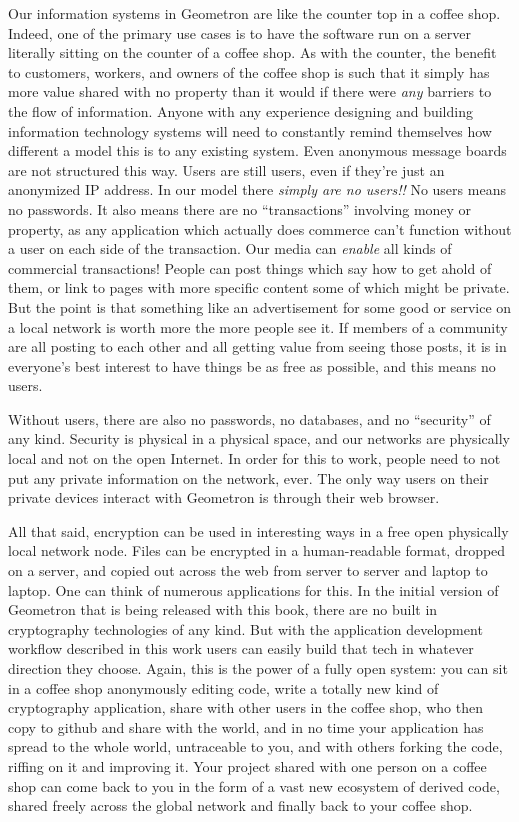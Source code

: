 Our information systems in Geometron are like the counter top in a coffee shop.  Indeed, one of the primary use cases is to have the software run on a server literally sitting on the counter of a coffee shop.  As with the counter, the benefit to customers, workers, and owners of the coffee shop is such that it simply has more value shared with no property than it would if there were \emph{any} barriers to the flow of information.  Anyone with any experience designing and building information technology systems will need to constantly remind themselves how different a model this is to any existing system.  Even anonymous message boards are not structured this way.  Users are still users, even if they're just an anonymized IP address.  In our model there \emph{simply are no users!!}  No users means no passwords. It also means there are no ``transactions'' involving money or property, as any application which actually does commerce can't function without a user on each side of the transaction.  Our media can \emph{enable} all kinds of commercial transactions! People can post things which say how to get ahold of them, or link to pages with more specific content some of which might be private.  But the point is that something like an advertisement for some good or service on a local network is worth more the more people see it.  If members of a community are all posting to each other and all getting value from seeing those posts, it is in everyone's best interest to have things be as free as possible, and this means no users.

Without users, there are also no passwords, no databases, and no ``security'' of any kind.  Security is physical in a physical space, and our networks are physically local and not on the open Internet.  In order for this to work, people need to not put any private information on the network, ever.  The only way users on their private devices interact with Geometron is through their web browser.  

All that said, encryption can be used in interesting ways in a free open physically local network node.  Files can be encrypted in a human-readable format, dropped on a server, and copied out across the web from server to server and laptop to laptop.  One can think of numerous applications for this.  In the initial version of Geometron that is being released with this book, there are no built in cryptography technologies of any kind.  But with the application development workflow described in this work users can easily build that tech in whatever direction they choose. Again, this is the power of a fully open system: you can sit in a coffee shop anonymously editing code, write a totally new kind of cryptography application, share with other users in the coffee shop, who then copy to github and share with the world, and in no time your application has spread to the whole world, untraceable to you, and with others forking the code, riffing on it and improving it.  Your project shared with one person on a coffee shop can come back to you in the form of a vast new ecosystem of derived code, shared freely across the global network and finally back to your coffee shop.  



